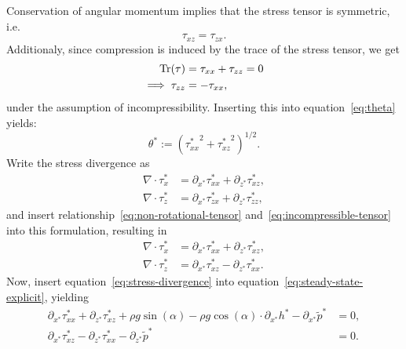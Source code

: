 Conservation of angular momentum implies that the stress tensor is symmetric, i.e. 
%
\begin{equation} \label{eq:non-rotational-tensor}
  \tau_{xz} = \tau_{zx}.
\end{equation}
%
Additionaly, since compression is induced by the trace of the stress tensor, we get
%
\begin{equation} \label{eq:incompressible-tensor}
  \begin{aligned}
    \operatorname{Tr}(\tau) &= \tau_{xx} + \tau_{zz} = 0 \\
    \implies \tau_{zz} &= -\tau_{xx},
  \end{aligned}
\end{equation}
%
under the assumption of incompressibility. Inserting this into equation~\eqref{eq:theta} yields:
%
\begin{equation*}
  \theta^* := \left( {\tau_{xx}^*}^2 + {\tau_{xz}^*}^2 \right) ^{1/2}.
\end{equation*}
%
Write the stress divergence as
%
\begin{equation}
  \begin{split}
    \nabla \cdot \tau_x^* &= \partial_{x^*} \tau_{xx}^* + \partial_{z^*} \tau_{xz}^*, \\
    \nabla \cdot \tau_z^* &= \partial_{x^*} \tau_{zx}^* + \partial_{z^*} \tau_{zz}^*,
  \end{split}
\end{equation}
%
and insert relationship~\eqref{eq:non-rotational-tensor} and~\eqref{eq:incompressible-tensor} into this formulation, resulting in
%
\begin{equation} \label{eq:stress-divergence}
  \begin{split}
    \nabla \cdot \tau_x^* &= \partial_{x^*} \tau_{xx}^* + \partial_{z^*} \tau_{xz}^*, \\
    \nabla \cdot \tau_z^* &= \partial_{x^*} \tau_{xz}^* - \partial_{z^*} \tau_{xx}^*.
  \end{split}
\end{equation}
%
Now, insert equation~\eqref{eq:stress-divergence} into equation~\eqref{eq:steady-state-explicit}, yielding
%
\begin{equation}
  \begin{split}
    \partial_{x^*} \tau_{xx}^* + \partial_{z^*} \tau_{xz}^* + \rho g \sin(\alpha) - \rho g \cos(\alpha) \cdot \partial_{x^*} h^* - \partial_{x^*} \tilde{p}^* &= 0, \\
    \partial_{x^*} \tau_{xz}^* - \partial_{z^*} \tau_{xx}^* - \partial_{z^*} \tilde{p}^* &= 0.
  \end{split}
\end{equation}
